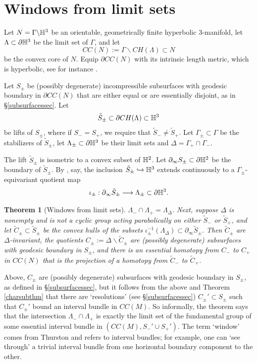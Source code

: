 \documentclass[12pt]{amsart}
\newtheorem{theorem}{Theorem}[section] \newtheorem{philosophy}{Statement}[theorem]
\theoremstyle{definition}
\theoremstyle{remark}
\begin{document}
\section{Windows from limit sets}
\label{windowssec}
Let $N=\Gamma \backslash \mathbb H^3$ be an orientable, geometrically finite hyperbolic $3$-manifold, let $\Lambda \subset \partial \mathbb H^3$ be the limit set of $\Gamma$, and let $$CC(N) := \Gamma \backslash CH(\Lambda) \subset N$$ be the convex core of $N$. Equip $ \partial CC(N)$  with  its intrinsic length metric, which is hyperbolic, see for instance \cite [Prop 8.5.1]{Thurstongeometry}. 


Let $S_\pm$ be (possibly degenerate) incompressible subsurfaces with geodesic boundary in $\partial CC(N)$ that are either equal or are essentially disjoint, as in \S \ref{subsurfacessec}. Let $$\tilde S_\pm \subset \partial CH(\Lambda) \subset \mathbb H^3$$ be lifts of $S_\pm$, where if $S_-=S_+$, we require that $\tilde S_-\neq \tilde S_+$. Let $\Gamma_\pm \subset \Gamma$ be the stabilizers of $\tilde S_\pm$, let $\Lambda_\pm \subset \partial \mathbb H^3$ be their limit sets and $\Delta=\Gamma_+\cap\Gamma_-$. 


The lift $\tilde S_\pm$ is isometric to a convex subset of $\mathbb H^2$. Let $\partial_\infty S_\pm \subset \partial \mathbb H^2$ be the boundary of $\tilde S_\pm$. By \cite[Theorem 5.6]{mj2017cannon}, say, the inclusion $\tilde S_\pm \hookrightarrow \mathbb H^3$ extends continuously to a $\Gamma_\pm$-equivariant quotient map $$\iota_\pm : \partial_\infty \tilde S_\pm \longrightarrow \Lambda_\pm \subset  \partial \mathbb H^3.$$


\begin{theorem}[Windows from limit sets]\label{windowsthm} 
$\Lambda_- \cap \Lambda_+ =\Lambda_\Delta$. Next, suppose $\Delta$ is nonempty and is not a cyclic group acting parabolically on either $\tilde S_-$ or $\tilde S_+$, and let $\tilde C_\pm \subset \tilde S_\pm$ be the convex hulls of the subsets $\iota_\pm^{-1}(\Lambda_\Delta) \subset \partial_\infty \tilde S_\pm.$ Then $\tilde C_\pm$ are $\Delta$-invariant, the quotients $C_\pm :=\Delta \backslash \tilde C_\pm $ are (possibly degenerate) subsurfaces with geodesic boundary in $S_\pm$, and there is an essential homotopy from $C_-$ to $C_+$ in $CC(N)$ that is the projection of a homotopy from $\tilde C_- $ to $\tilde C_+$.
\end{theorem}

Above, $C_\pm$ are (possibly degenerate) subsurfaces with geodesic boundary in $S_\pm$, as defined in \S \ref{subsurfacessec}, but it follows from the above and Theorem \ref{charsubthm} that there are `resolutions' (see \S \ref{subsurfacessec}) $C_\pm'\subset S_\pm$ such that $C_\pm'$ bound an interval bundle in $CC(M)$. So informally, the theorem says that the intersection $\Lambda_- \cap \Lambda_+$ is exactly the limit set of the fundamental group of some essential interval bundle in $(CC(M),S_-'\cup S_+')$. The term `window' comes from Thurston \cite{Thurstonhyperbolic3} and refers to interval bundles; for example, one can `see through' a trivial interval bundle from one horizontal boundary component to the other. 
\end{document}
